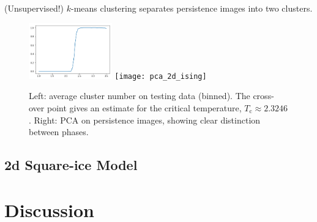 \documentclass[11pt]{article}
\begin{document}
(Unsupervised!) $k$-means clustering separates persistence images into two clusters.

\begin{figure}[h]
    \centering
    \includegraphics[width=0.32\textwidth]{kmeans_avg_2d_ising}
    \texttt{[image: pca\_2d\_ising]}
    \caption{Left: average cluster number on testing data (binned). The cross-over point gives an estimate for the critical temperature, $T_\text{c}\approx 2.3246$. Right: PCA on persistence images, showing clear distinction between phases.}
\end{figure}

\subsection{2d Square-ice Model}

\section{Discussion}
\end{document}
